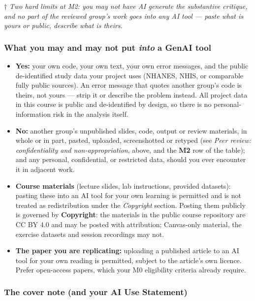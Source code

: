 \documentclass[
]{article}
\providecommand{\tightlist}{%
  \setlength{\itemsep}{0pt}\setlength{\parskip}{0pt}}
\begin{document}
† \emph{Two hard limits at M2: you may not have AI generate the
substantive critique, and no part of the reviewed group's work goes into
any AI tool --- paste what is yours or public, describe what is theirs.}

\subsubsection{\texorpdfstring{What you may and may not put \emph{into}
a GenAI
tool}{What you may and may not put into a GenAI tool}}\label{what-you-may-and-may-not-put-into-a-genai-tool}

\begin{itemize}
\tightlist
\item
  \textbf{Yes:} your own code, your own text, your own error messages,
  and the public de-identified study data your project uses (NHANES,
  NHIS, or comparable fully public sources). An error message that
  quotes another group's code is theirs, not yours --- strip it or
  describe the problem instead. All project data in this course is
  public and de-identified by design, so there is no
  personal-information risk in the analysis itself.
\item
  \textbf{No:} another group's unpublished slides, code, output or
  review materials, in whole or in part, pasted, uploaded, screenshotted
  or retyped (see \emph{Peer review: confidentiality and
  non-appropriation}, above, and the \textbf{M2} row of the table); and
  any personal, confidential, or restricted data, should you ever
  encounter it in adjacent work.
\item
  \textbf{Course materials} (lecture slides, lab instructions, provided
  datasets): pasting these into an AI tool for your own learning is
  permitted and is not treated as redistribution under the
  \emph{Copyright} section. Posting them publicly is governed by
  \textbf{Copyright}: the materials in the public course repository are
  CC BY 4.0 and may be posted with attribution; Canvas-only material,
  the exercise datasets and session recordings may not.
\item
  \textbf{The paper you are replicating:} uploading a published article
  to an AI tool for your own reading is permitted, subject to the
  article's own licence. Prefer open-access papers, which your M0
  eligibility criteria already require.
\end{itemize}

\subsubsection{The cover note (and your AI Use
Statement)}\label{the-cover-note-and-your-ai-use-statement}
\end{document}
